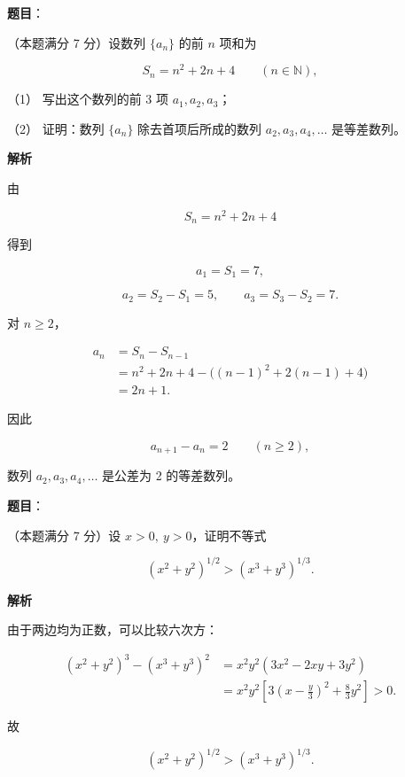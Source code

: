 \begin{answer}

\textbf{题目}：

（本题满分 7 分）设数列 $\{a_n\}$ 的前 $n$ 项和为

\nopagebreak[4]
\[
S_n=n^2+2n+4\qquad(n\in\mathbb N),
\]

（1） 写出这个数列的前 $3$ 项 $a_1,a_2,a_3$；

（2） 证明：数列 $\{a_n\}$ 除去首项后所成的数列 $a_2,a_3,a_4,\ldots$ 是等差数列。

\textbf{解析}


由

\nopagebreak[4]
\[
S_n=n^2+2n+4
\]

得到

\nopagebreak[4]
\[
a_1=S_1=7,
\]

\nopagebreak[4]
\[
a_2=S_2-S_1=5,\qquad
a_3=S_3-S_2=7.
\]


对 $n\ge2$，

\nopagebreak[4]
\[
\begin{aligned}
a_n
&=S_n-S_{n-1}\\
&=n^2+2n+4-\bigl((n-1)^2+2(n-1)+4\bigr)\\
&=2n+1.
\end{aligned}
\]

因此

\nopagebreak[4]
\[
a_{n+1}-a_n=2\qquad(n\ge2),
\]

数列 $a_2,a_3,a_4,\ldots$ 是公差为 2 的等差数列。



\end{answer}
\begin{answer}

\textbf{题目}：

（本题满分 7 分）设 $x>0,\ y>0$，证明不等式

\nopagebreak[4]
\[
(x^2+y^2)^{1/2}>(x^3+y^3)^{1/3}.
\]

\textbf{解析}

由于两边均为正数，可以比较六次方：

\nopagebreak[4]
\[
\begin{aligned}
(x^2+y^2)^3-(x^3+y^3)^2
&=x^2y^2(3x^2-2xy+3y^2)\\
&=x^2y^2\left[3\left(x-\frac y3\right)^2
+\frac83y^2\right]>0.
\end{aligned}
\]

故

\nopagebreak[4]
\[
(x^2+y^2)^{1/2}>(x^3+y^3)^{1/3}.
\]


\end{answer}
